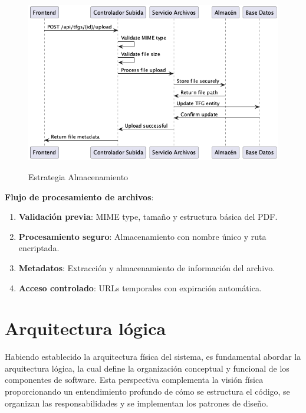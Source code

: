 \documentclass[12pt,a4paper,oneside]{report}
\providecommand{\tightlist}{%
  \setlength{\itemsep}{0pt}\setlength{\parskip}{0pt}}
\providecommand{\pandocbounded}[1]{#1}
\begin{document}
\begin{figure}[H]
\centering
\pandocbounded{\includegraphics[keepaspectratio,alt={Estrategia Almacenamiento}]{processed/images/05_diseno_plantuml_2.png}}
\caption{Estrategia Almacenamiento}
\label{fig:estrategia-almacenamiento}
\end{figure}

\textbf{Flujo de procesamiento de archivos}:

\begin{enumerate}
\def\labelenumi{\arabic{enumi}.}
\tightlist
\item
  \textbf{Validación previa}: MIME type, tamaño y estructura básica del
  PDF.
\item
  \textbf{Procesamiento seguro}: Almacenamiento con nombre único y ruta
  encriptada.
\item
  \textbf{Metadatos}: Extracción y almacenamiento de información del
  archivo.
\item
  \textbf{Acceso controlado}: URLs temporales con expiración automática.
\end{enumerate}

\section{Arquitectura lógica}\label{arquitectura-luxf3gica}

Habiendo establecido la arquitectura física del sistema, es fundamental
abordar la arquitectura lógica, la cual define la organización
conceptual y funcional de los componentes de software. Esta perspectiva
complementa la visión física proporcionando un entendimiento profundo de
cómo se estructura el código, se organizan las responsabilidades y se
implementan los patrones de diseño.
\end{document}
